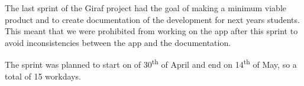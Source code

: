 The last sprint of the Giraf project had the goal of making a minimum viable product and to create documentation of the development for next years students.
This meant that we were prohibited from working on the app after this sprint to avoid inconsistencies between the app and the documentation.

The sprint was planned to start on of 30\textsuperscript{th} of April and end on 14\textsuperscript{th} of May, so a total of 15 workdays.
